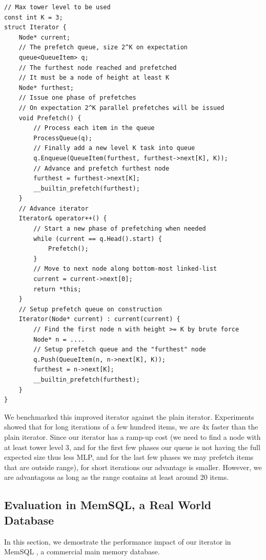 \documentclass[11pt, usletter]{article}
\begin{document}
\singlespacing\begin{codebox}
\begin{verbatim}
// Max tower level to be used 
const int K = 3;
struct Iterator {
    Node* current;
    // The prefetch queue, size 2^K on expectation
    queue<QueueItem> q;
    // The furthest node reached and prefetched
    // It must be a node of height at least K
    Node* furthest;
    // Issue one phase of prefetches
    // On expectation 2^K parallel prefetches will be issued
    void Prefetch() {
        // Process each item in the queue 
        ProcessQueue(q);
        // Finally add a new level K task into queue
        q.Enqueue(QueueItem(furthest, furthest->next[K], K));
        // Advance and prefetch furthest node
        furthest = furthest->next[K];
        __builtin_prefetch(furthest);
    }
    // Advance iterator
    Iterator& operator++() {
        // Start a new phase of prefetching when needed
        while (current == q.Head().start) {
            Prefetch();
        }
        // Move to next node along bottom-most linked-list 
        current = current->next[0]; 
        return *this;
    }
    // Setup prefetch queue on construction 
    Iterator(Node* current) : current(current) {
        // Find the first node n with height >= K by brute force
        Node* n = ....
        // Setup prefetch queue and the "furthest" node
        q.Push(QueueItem(n, n->next[K], K));
        furthest = n->next[K];
        __builtin_prefetch(furthest);
    }
}
\end{verbatim}
\end{codebox}\doublespacing

We benchmarked this improved iterator against the plain iterator. 
Experiments showed that for long iterations of a few hundred items, 
we are 4x faster than the plain iterator.
Since our iterator has a ramp-up cost (we need to find a node with at least tower level 3, 
and for the first few phases our queue is not having the full expected size thus less MLP, 
and for the last few phases we may prefetch items that are outside range), 
for short iterations our advantage is smaller. 
However, we are advantagous as long as the range contains at least around 20 items.

\subsection{Evaluation in MemSQL, a Real World Database} \label{sliter_memsql}

In this section, we demostrate the performance impact of our iterator in MemSQL \cite{memsql}, 
a commercial main memory database.
\end{document}
